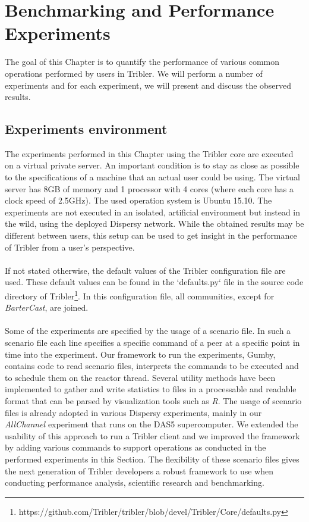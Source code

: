 \chapter{Benchmarking and Performance Experiments}
\label{chapter:experiments}

The goal of this Chapter is to quantify the performance of various common operations performed by users in Tribler. We will perform a number of experiments and for each experiment, we will present and discuss the observed results.

\section{Experiments environment}
The experiments performed in this Chapter using the Tribler core are executed on a virtual private server. An important condition is to stay as close as possible to the specifications of a machine that an actual user could be using. The virtual server has 8GB of memory and 1 processor with 4 cores (where each core has a clock speed of 2.5GHz). The used operation system is Ubuntu 15.10. The experiments are not executed in an isolated, artificial environment but instead in the wild, using the deployed Dispersy network. While the obtained results may be different between users, this setup can be used to get insight in the performance of Tribler from a user's perspective.\\\\
If not stated otherwise, the default values of the Tribler configuration file are used. These default values can be found in the `defaults.py` file in the source code directory of Tribler\footnote{https://github.com/Tribler/tribler/blob/devel/Tribler/Core/defaults.py}. In this configuration file, all communities, except for \emph{BarterCast}, are joined.\\\\
Some of the experiments are specified by the usage of a scenario file. In such a scenario file each line specifies a specific command of a peer at a specific point in time into the experiment. Our framework to run the experiments, Gumby, contains code to read scenario files, interprets the commands to be executed and to schedule them on the reactor thread. Several utility methods have been implemented to gather and write statistics to files in a processable and readable format that can be parsed by visualization tools such as \emph{R}. The usage of scenario files is already adopted in various Dispersy experiments, mainly in our \emph{AllChannel} experiment that runs on the DAS5 supercomputer. We extended the usability of this approach to run a Tribler client and we improved the framework by adding various commands to support operations as conducted in the performed experiments in this Section. The flexibility of these scenario files gives the next generation of Tribler developers a robust framework to use when conducting performance analysis, scientific research and benchmarking.

